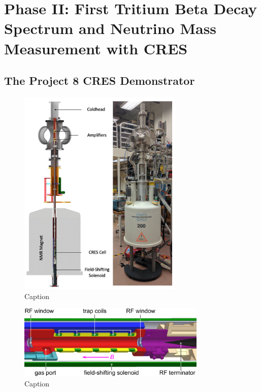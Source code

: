 \section{Phase II: First Tritium Beta Decay Spectrum and Neutrino Mass Measurement with CRES}

\subsection{The Project 8 CRES Demonstrator}

\begin{figure}[htbp]
    \centering
    \includegraphics[width=0.7\textwidth]{figs/Chapter-3/phaseII_system.png}
    \caption{Caption}
    \label{fig:phase2_apparatus}
\end{figure}

\begin{figure}[htbp]
    \centering
    \includegraphics[width=0.8\textwidth]{figs/Chapter-3/apparatus.pdf}
    \caption{Caption}
    \label{fig:phase2_cres_cell}
\end{figure}

